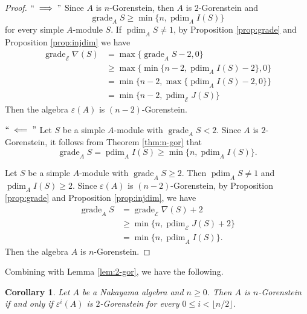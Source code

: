 \documentclass[a4paper,reqno]{amsart}
\numberwithin{equation}{section}
\theoremstyle{plain}
\newtheorem{cor}[thm]{Corollary}
\theoremstyle{definition}
\theoremstyle{remark}
\DeclareMathOperator{\grade}{grade}
\DeclareMathOperator{\pdim}{pdim}
\renewcommand{\-}{\mbox{-}}
\newcommand{\scE}{\mathcal{E}}
\begin{document}
\begin{proof}
\(``\implies"\)
Since \(A\) is \(n\)-Gorenstein, 
then \(A\) is \(2\)-Gorenstein and 
\begin{equation*}
    \grade_AS\ge\min\{n,\pdim_AI(S)\}
\end{equation*}
for every simple \(A\)-module \(S\).
If \(\pdim_AS\neq 1\),
by Proposition \ref{prop:grade} and Proposition \ref{prop:injdim} we have
\begin{equation*}
    \begin{aligned}
    \grade_{\scE}\nabla(S) &=\max\{\grade_AS-2,0\}\\
                        &\ge \max\{\min\{n-2,\pdim_AI(S)-2\},0\}\\
                        & =\min\{n-2,\max\{\pdim_AI(S)-2,0\}\}\\
                        & =\min\{n-2,\pdim_{\scE}J(S)\}
    \end{aligned}
\end{equation*}
Then the algebra \(\varepsilon(A)\) is \((n-2)\)-Gorenstein.


\(``\impliedby"\)
Let \(S\) be a simple \(A\)-module with \(\grade_AS< 2\). 
Since \(A\) is \(2\)-Gorenstein, 
it follows from Theorem \ref{thm:n-gor} that
\begin{equation*}
    \grade_AS = \pdim_AI(S)\geq \min\{n,\pdim_AI(S)\}.
\end{equation*}


Let \(S\) be a simple \(A\)-module with \(\grade_AS\ge 2\).
Then $\pdim_AS\neq1$ and \(\pdim_AI(S)\ge 2\).
Since \(\varepsilon(A)\) is \((n-2)\)-Gorenstein, 
by Proposition \ref{prop:grade} and Proposition \ref{prop:injdim}, we have
\begin{equation*}
    \begin{aligned} 
    \grade_AS &= \grade_{\scE}\nabla(S)+2\\
              &\ge\min\{n,\pdim_{\scE}J(S)+2\}\\
              &=\min\{n,\pdim_AI(S)\}.
    \end{aligned}
\end{equation*}
Then the algebra \(A\) is \(n\)-Gorenstein.
\end{proof}


Combining  with Lemma \ref{lem:2-gor}, we have the following.


\begin{cor}
Let \(A\) be a Nakayama algebra and \(n\ge 0\). 
Then \(A\) is \(n\)-Gorenstein if and only if 
\(\varepsilon^i(A)\) is \(2\)-Gorenstein for every \(0\le i< \lfloor n/2\rfloor\).
\end{cor}    
\end{document}
